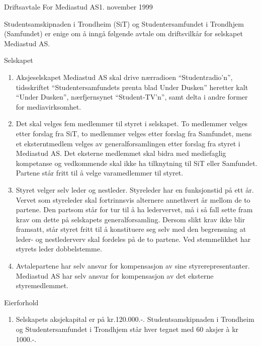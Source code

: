 \begin{instruks}{Driftsavtale For Mediastud AS}{1. november 1999}{}

	\begin{instruksledd}{ }
		Studentsamskipnaden i Trondheim (SiT) og Studentersamfundet i
		Trondhjem (Samfundet) er enige om å inngå
		følgende avtale om driftsvilkår for selskapet Mediastud AS.
	\end{instruksledd}

	\begin{instruksledd}{Selskapet}
		\begin{enumerate}
		\item Aksjeselskapet Mediastud AS skal drive nærradioen
		``Studentradio'n'', tidsskriftet ``Studentersamfundets
		prenta blad Under Dusken'' heretter kalt ``Under Dusken'',
		nærfjernsynet ``Student-TV'n'', samt delta i andre
		former for mediavirksomhet.
		\item Det skal velges fem medlemmer til styret i selskapet. To
		medlemmer velges etter forslag fra SiT, to
		medlemmer velges etter forslag fra Samfundet, mens et
		eksterntmedlem velges av generalforsamlingen etter
		forslag fra styret i Mediastud AS. Det eksterne medlemmet skal
		bidra med mediefaglig kompetanse og
		vedkommende skal ikke ha tilknytning til SiT eller Samfundet.
		Partene står fritt til å velge varamedlemmer til
		styret.
		\item Styret velger selv leder og nestleder. Styreleder har en
		funksjonstid på ett år. Vervet som styreleder skal
		fortrinnsvis alternere annethvert år mellom de to partene. Den
		partsom står for tur til å ha ledervervet, må i så
		fall sette fram krav om dette på selskapets generalforsamling.
		Dersom slikt krav ikke blir framsatt, står styret
		fritt til å konstituere seg selv med den begrensning at leder-
		og nestlederverv skal fordeles på de to partene.
		Ved stemmelikhet har styrets leder dobbelstemme.
		\item Avtalepartene har selv ansvar for kompensasjon av sine
		styrerepresentanter. Mediastud AS har selv ansvar
		for kompensasjon av det eksterne styremedlemmet.
		\end{enumerate}
	\end{instruksledd}

	\begin{instruksledd}{Eierforhold}
		\begin{enumerate}
		\item Selskapets aksjekapital er på kr.120.000.-.
		Studentsamskipnaden i Trondheim og Studentersamfundet i
		Trondhjem står hver tegnet med 60 aksjer à kr 1000.-.
		\end{enumerate}
	\end{instruksledd}


\end{instruks}

